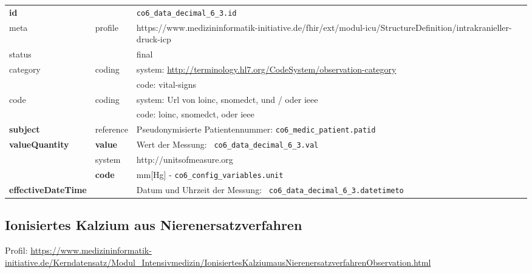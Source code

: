 \begin{longtable}{|l|l|p{7.5cm}|}
        \hline
        \rowcolor{lightgray} \multicolumn{3}{|l|}{Data Mapping (inhaltlich)} \\ \hline
        \textbf{id} &  & \texttt{co6\_data\_decimal\_6\_3.id} \\ \hline
	meta & profile & https://www.medizininformatik-initiative.de/fhir/ext/modul-icu/StructureDefinition/intrakranieller-druck-icp \\ \hline 
	status &  & final   \\ \hline 
	category & coding & system: \url{http://terminology.hl7.org/CodeSystem/observation-category} \\
\cline{3-3}
	& & code: vital-signs \\ \hline
	code & coding & system: Url von \ac{loinc}, \ac{snomedct}, und / oder \ac{ieee} \\ 
	\cline{3-3} 
	 &  & code: \ac{loinc}, \ac{snomedct}, oder \ac{ieee} \\ \hline
	 \textbf{subject}  & reference & Pseudonymisierte Patientennummer: \texttt{co6\_medic\_patient.patid} \\ \hline
	 \textbf{valueQuantity}  & \textbf{value} & Wert der Messung: \texttt{
co6\_data\_decimal\_6\_3.val} \\
        \cline{2-3}
         & system & http://unitsofmeasure.org \\
         \cline{2-3}
         & \textbf{code} & mm[Hg] - \texttt{co6\_config\_variables.unit} \\ \hline
     \textbf{effectiveDateTime}  & & Datum und Uhrzeit der Messung: \texttt{
co6\_data\_decimal\_6\_3.datetimeto} \\
     \hline
\end{longtable}

\subsection{Ionisiertes Kalzium aus Nierenersatzverfahren} 
Profil: \url{https://www.medizininformatik-initiative.de/Kerndatensatz/Modul_Intensivmedizin/IonisiertesKalziumausNierenersatzverfahrenObservation.html}


